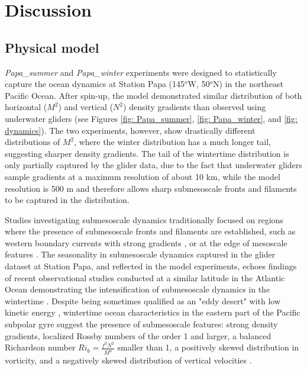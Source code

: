 \documentclass[draft,linenumbers]{agujournal2018}
\begin{document}
\section{Discussion}
\label{sec: Discussion}

\subsection{Physical model}
\label{sec: Discussion_model}
\textit{Papa\_summer} and \textit{Papa\_winter} experiments were designed to statistically capture the ocean dynamics at Station Papa (145$^o$W, 50$^o$N) in the northeast Pacific Ocean. After spin-up, the model demonstrated similar distribution of both horizontal ($M^2$) and vertical ($N^2$) density gradients than observed using underwater gliders (see Figures \ref{fig: Papa_summer}, \ref{fig: Papa_winter}, and \ref{fig: dynamics}). The two experiments, however, show drastically different distributions of $M^2$, where the winter distribution has a much longer tail, suggesting sharper density gradients. The tail of the wintertime distribution is only partially captured by the glider data, due to the fact that underwater gliders sample gradients at a maximum resolution of about 10 km, while the model resolution is 500 m and therefore allows sharp submesoscale fronts and filaments to be captured in the distribution.

Studies investigating submesoscale dynamics traditionally focused on regions where the presence of submesoscale fronts and filaments are established, such as western boundary currents with strong gradients \citep{Dasaro_2011, Thomas_2013}, or at the edge of mesoscale features \citep{vanHaren_2006,Waite_2016}. The seasonality in submesoscale dynamics captured in the glider dataset at Station Papa, and reflected in the model experiments, echoes findings of recent observational studies conducted at a similar latitude in the Atlantic Ocean demonstrating the intensification of submesoscale dynamics in the wintertime \citep{Thompson_2016, Buckingham_2016}. Despite being sometimes qualified as an "eddy desert" with low kinetic energy \citep{Chelton_2011}, wintertime ocean characteristics in the eastern part of the Pacific subpolar gyre suggest the presence of submesoscale features: strong density gradients, localized Rossby numbers of the order 1 and larger, a balanced Richardson number $Ri_b = \frac{f^2N^2}{M^4}$ smaller than 1, a positively skewed distribution in vorticity, and a negatively skewed distribution of vertical velocities \citep[see Figure \ref{fig: dynamics};][]{Thomas_2008,Rudnick_2001, Buckingham_2016}.
\end{document}
